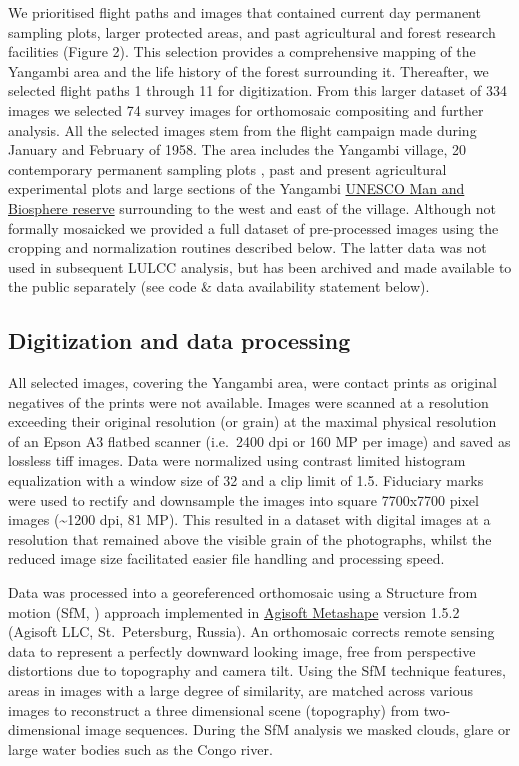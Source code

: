 \documentclass[remote sensing,article,submit,moreauthors,pdftex]{mdpi}
\begin{document}
We prioritised flight paths and images that contained current day
permanent sampling plots, larger protected areas, and past agricultural
and forest research facilities (Figure 2). This selection provides a
comprehensive mapping of the Yangambi area and the life history of the
forest surrounding it. Thereafter, we selected flight paths 1 through 11
for digitization. From this larger dataset of 334 images we selected 74
survey images for orthomosaic compositing and further analysis. All the
selected images stem from the flight campaign made during January and
February of 1958. The area includes the Yangambi village, 20
contemporary permanent sampling plots \citep{Kearsley2013}, past and
present agricultural experimental plots \citep{bauters2015} and large
sections of the Yangambi
\href{http://www.unesco.org/new/en/natural-sciences/environment/ecological-sciences/biosphere-reserves/africa/democratic-republic-of-the-congo/yangambi/}{UNESCO
Man and Biosphere reserve} surrounding to the west and east of the
village. Although not formally mosaicked we provided a full dataset of
pre-processed images using the cropping and normalization routines
described below. The latter data was not used in subsequent LULCC
analysis, but has been archived and made available to the public
separately (see code \& data availability statement below).

\hypertarget{digitization-and-data-processing}{%
\subsection{Digitization and data
processing}\label{digitization-and-data-processing}}

All selected images, covering the Yangambi area, were contact prints as
original negatives of the prints were not available. Images were scanned
at a resolution exceeding their original resolution (or grain) at the
maximal physical resolution of an Epson A3 flatbed scanner (i.e.~2400
dpi or 160 MP per image) and saved as lossless tiff images. Data were
normalized using contrast limited histogram equalization
\citep{zuiderveld1994} with a window size of 32 and a clip limit of 1.5.
Fiduciary marks were used to rectify and downsample the images into
square 7700x7700 pixel images (\textasciitilde{}1200 dpi, 81 MP). This
resulted in a dataset with digital images at a resolution that remained
above the visible grain of the photographs, whilst the reduced image
size facilitated easier file handling and processing speed.

Data was processed into a georeferenced orthomosaic using a Structure
from motion (SfM, \citet{ullman1979}) approach implemented in
\href{http://www.agisoft.com}{Agisoft Metashape} version 1.5.2 (Agisoft
LLC, St.~Petersburg, Russia). An orthomosaic corrects remote sensing
data to represent a perfectly downward looking image, free from
perspective distortions due to topography and camera tilt. Using the SfM
technique features, areas in images with a large degree of similarity,
are matched across various images to reconstruct a three dimensional
scene (topography) from two-dimensional image sequences. During the SfM
analysis we masked clouds, glare or large water bodies such as the Congo
river.
\end{document}
